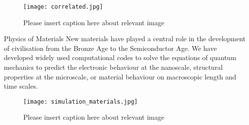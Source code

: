 \documentclass[xcolor={table}]{beamer}
\begin{document}
\begin{frame}[fragile=singleslide,t]
\begin{columns}[onlytextwidth,T]
\begin{column}{.47\textwidth}
\begin{figure}
    \texttt{[image: correlated.jpg]}
    \caption{\footnotesize Please insert caption here about relevant image}
\end{figure}

\begin{block}{Physics of Materials}
New materials have played a central role in the development of civilisation from
the Bronze Age to the Semiconductor Age. We have developed widely used
computational codes to solve the equations of quantum mechanics to predict the
electronic behaviour at the nanoscale, structural properties at the microscale,
or material behaviour on macroscopic length and time scales.
\end{block}

\begin{figure}
    \texttt{[image: simulation\_materials.jpg]}
    \caption{\footnotesize Please insert caption here about relevant image}
\end{figure}

\end{column}
\end{columns}

\end{frame}
\end{document}
